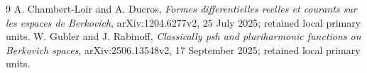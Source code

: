 \documentclass[11pt]{article}
\begin{document}
\begin{thebibliography}{9}
 A. Chambert-Loir and A. Ducros, \emph{Formes differentielles
reelles et courants sur les espaces de Berkovich}, arXiv:1204.6277v2,
25 July 2025; retained local primary units.
 W. Gubler and J. Rabinoff, \emph{Classically psh and
pluriharmonic functions on Berkovich spaces}, arXiv:2506.13548v2,
17 September 2025; retained local primary units.
\end{thebibliography}
\end{document}
